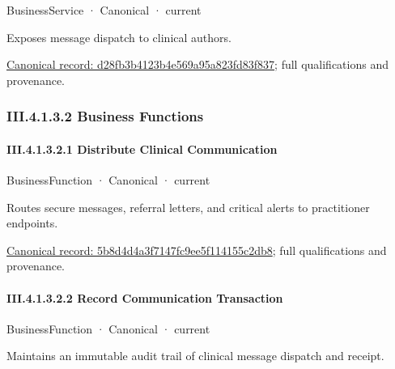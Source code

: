 \label{element:d28fb3b4123b4e569a95a823fd83f837}
{\small BusinessService · Canonical · current}\par

Exposes message dispatch to clinical authors.


{\footnotesize \href{../../../../../../../continuum/business/business-service/d28fb3b4123b4e569a95a823fd83f837.md}{Canonical record: d28fb3b4123b4e569a95a823fd83f837}; full qualifications and provenance.}\par
\subsubsection*{III.4.1.3.2 Business Functions}
\label{navigation:III.4.1.3.2}

\paragraph*{III.4.1.3.2.1 Distribute Clinical Communication}
\label{navigation:III.4.1.3.2.1}

\label{element:5b8d4d4a3f7147fc9ee5f114155c2db8}
{\small BusinessFunction · Canonical · current}\par

Routes secure messages, referral letters, and critical alerts to practitioner endpoints.


{\footnotesize \href{../../../../../../../continuum/business/business-function/5b8d4d4a3f7147fc9ee5f114155c2db8.md}{Canonical record: 5b8d4d4a3f7147fc9ee5f114155c2db8}; full qualifications and provenance.}\par
\paragraph*{III.4.1.3.2.2 Record Communication Transaction}
\label{navigation:III.4.1.3.2.2}

\label{element:d64ced698052400fa7892e4d768b3f8f}
{\small BusinessFunction · Canonical · current}\par

Maintains an immutable audit trail of clinical message dispatch and receipt.


